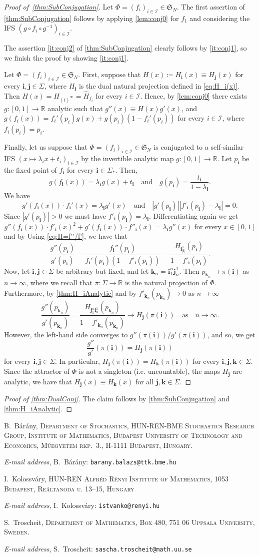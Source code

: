 \documentclass[12pt,]{article}
\makeatletter
\def\cref#1{\ref{#1}}%
\theoremstyle{definition}
\theoremstyle{remark}
\newcommand{\0}{\mathbf{0}}
\newcommand{\bi}{\mathbf{i}}
\newcommand{\bj}{\mathbf{j}}
\newcommand{\bk}{{\mathbf{k}}}
\newcommand{\Addresses}{{%
  \bigskip
  \footnotesize

  B.~B\'ar\'any, \textsc{Department of Stochastics, HUN-REN-BME Stochastics Research Group,
  Institute of Mathematics, Budapest University of Technology and Economics, M\H{u}egyetem rkp.~3.,
H-1111 Budapest, Hungary.}\par\nopagebreak
  \textit{E-mail address}, B.~B\'ar\'any: \texttt{barany.balazs@ttk.bme.hu}

  \medskip

  I.~Kolossv\'ary, \textsc{HUN-REN Alfr\'ed R\'enyi Institute of Mathematics, 1053 Budapest, Re\'altanoda u.
13–15, Hungary}\par\nopagebreak
  \textit{E-mail address}, I.~Kolossv\'ary: \texttt{istvanko@renyi.hu}
   \medskip


  S.~Troscheit, \textsc{Department of Mathematics, Box 480, 751 06 Uppsala University, Sweden.}\par\nopagebreak
  \textit{E-mail address}, S.~Troscheit: \texttt{sascha.troscheit@math.uu.se}
}}
\makeatother
\begin{document}
\begin{proof}[Proof of~\cref{thm:SubConjugation}]
	Let $\Phi=(f_i)_{i\in\mathcal{I}}\in\mathfrak{S}_N$. The first assertion of \cref{thm:SubConjugation} follows by applying \cref{lem:conj0} for $f_1$ and considering the IFS $(g\circ f_i\circ g^{-1})_{i\in\mathcal{I}}$.
	
	The assertion \cref{it:conj2} of \cref{thm:SubConjugation} clearly follows by \cref{it:conj1}, so we finish the proof by showing \cref{it:conj1}.
	
	Let $\Phi=(f_i)_{i\in\mathcal{I}}\in\mathfrak{S}_N$. First, suppose that $H(x)\coloneqq H_{\bi}(x)\equiv H_{\bj}(x)$ for every $\bi,\bj\in\Sigma$, where $H_{\bi}$ is the dual natural projection defined in \cref{eq:H_i(x)}. Then $H(x)=H_{(i)^{\infty}}=\hat{H}_{f_i}$ for every $i\in\mathcal{I}$. Hence, by \cref{lem:conj0} there exists $g\colon[0,1]\to\mathbb{R}$ analytic such that $g''(x)\equiv H(x)g'(x)$, and $g(f_i(x))=f_i'(p_i)g(x)+g(p_i)(1-f_i'(p_i))$ for every $i\in\mathcal{I}$, where $f_i(p_i)=p_i$.
	
	Finally, let us suppose that $\Phi=(f_i)_{i\in\mathcal{I}}\in\mathfrak{S}_N$ is conjugated to a self-similar IFS $(x\mapsto \lambda_ix+t_i)_{i\in\mathcal{I}}$ by the invertible analytic map $g\colon[0,1]\to\mathbb{R}$. Let $p_{\bi}$ be the fixed point of $f_{\bi}$ for every $\bi\in\Sigma_*$. 
	Then,
\[
g(f_{\bi}(x)) = \lambda_{\bi} g(x) + t_{\bi}
\quad\text{and}\quad
g(p_{\bi}) = \frac{t_{\bi}}{1-\lambda_{\bi}}.
\]
We have
\[
g'(f_{\bi}(x))\cdot f_{\bi}'(x) = \lambda_{\bi} g'(x)
\quad\text{and}\quad
|g'(p_{\bi})||f'_{\bi}(p_{\bi})-\lambda_{\bi}| = 0.
\]
Since $|g'(p_{\bi})|>0$ we must have $f'_{\bi}(p_{\bi}) = \lambda_{\bi}$.
Differentiating again we get
\[
g''(f_{\bi}(x))\cdot f'_{\bi}(x)^2 +g'(f_{\bi}(x))\cdot f''_{\bi}(x) = \lambda_{\bi} g''(x)\text{ for every }x\in[0,1]
\]
and by Using \cref{eq:H=f''/f'}, we have that
\[
\frac{g''(p_{\bi})}{g'(p_{\bi})} =
\frac{f_{\bi}''(p_{\bi})}{f_{\bi}'(p_{\bi})(1-f'_{\bi}(p_{\bi}))}
=\frac{H_{\bi_{|\bi|}^1}(p_{\bi})}{1-f'_{\bi}(p_{\bi})}.
\]
Now, let $\bi,\bj\in\Sigma$ be arbitrary but fixed, and let $\bk_n = \bi_1^{n} \bj_n^1$. Then $p_{\bk_n}\to \pi(\bi)$ as $n\to\infty$, where we recall that $\pi\colon\Sigma\to\mathbb{R}$ is the natural projection of $\Phi$. Furthermore, by \cref{thm:H_iAnalytic} and by $f'_{\bk_n}(p_{\bk_n})\to0$ as $n\to\infty$
\[
\frac{g''(p_{\bk_n})}{g'(p_{\bk_n})}
=\frac{H_{\bj_1^n \bi_n^1}(p_{\bk_n})}{1-f'_{\bk_n}(p_{\bk_n})}
\to
H_{\bj}(\pi(\bi))\quad \text{as}\quad n\to\infty.
\]
However, the left-hand side converges to $g''(\pi(\bi))/g'(\pi(\bi))$, and so, we get 
$$
\frac{g''}{g'}(\pi(\bi))=H_{\bj}(\pi(\bi))
$$
for every $\bi,\bj\in\Sigma$. In particular, $H_{\bj}(\pi(\bi))=H_{\bk}(\pi(\bi))$ for every $\bi,\bj,\bk\in\Sigma$. Since the attractor of $\Phi$ is not a singleton (i.e. uncountable), the maps $H_{\bj}$ are analytic, we have that $H_{\bj}(x)\equiv H_{\bk}(x)$ for all $\bj,\bk\in \Sigma$.
\end{proof}

\begin{proof}[Proof of \cref{thm:DualConj}]
	The claim follows by \cref{thm:SubConjugation} and \cref{thm:H_iAnalytic}.
\end{proof}






\Addresses
\end{document}
